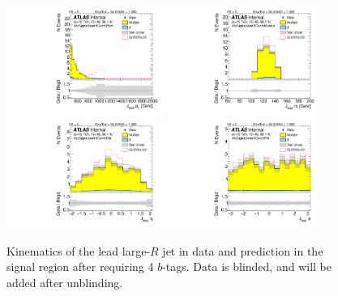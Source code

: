 \begin{figure}[htbp!]
\begin{center}
\includegraphics[angle=270, width=0.45\textwidth]{./figures/boosted/Signal/b77_FourTag_Signal_leadHCand_Pt_m_blind.pdf}
\includegraphics[angle=270, width=0.45\textwidth]{./figures/boosted/Signal/b77_FourTag_Signal_leadHCand_Mass_s_blind.pdf}\\
\includegraphics[angle=270, width=0.45\textwidth]{./figures/boosted/Signal/b77_FourTag_Signal_leadHCand_Eta_blind.pdf}
\includegraphics[angle=270, width=0.45\textwidth]{./figures/boosted/Signal/b77_FourTag_Signal_leadHCand_Phi_blind.pdf}
  \caption{Kinematics of the lead large-$R$ jet in data and prediction in the signal region after requiring 4 $b$-tags. Data is blinded, and will be added after unblinding.}
  \label{fig:boosted-4b-signal-blind-ak10-lead}
\end{center}
\end{figure}

